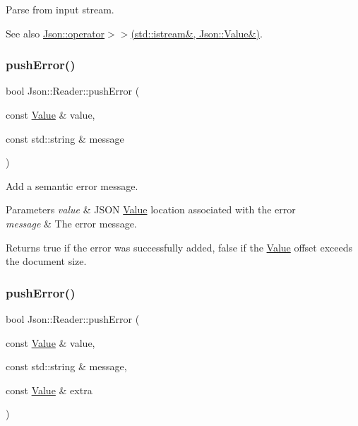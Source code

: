 Parse from input stream. 

\begin{DoxySeeAlso}{See also}
\hyperlink{namespace_json_a4d245ef719cc0853e8e78eb5f99c16e5}{Json\+::operator$>$$>$(std\+::istream\&, Json\+::\+Value\&)}. 
\end{DoxySeeAlso}
\mbox{\label{class_json_1_1_reader_ade6c28e0ef00d8f2e0aa2283f91c3e37}} 
\subsubsection{\texorpdfstring{push\+Error()}{pushError()}\hspace{0.1cm}{\footnotesize\ttfamily [1/2]}}
{\footnotesize\ttfamily bool Json\+::\+Reader\+::push\+Error (\begin{DoxyParamCaption}\item[{const \hyperlink{class_json_1_1_value}{Value} \&}]{value,  }\item[{const std\+::string \&}]{message }\end{DoxyParamCaption})}



Add a semantic error message. 


\begin{DoxyParams}{Parameters}
{\em value} & J\+S\+ON \hyperlink{class_json_1_1_value}{Value} location associated with the error \\
\hline
{\em message} & The error message. \\
\hline
\end{DoxyParams}
\begin{DoxyReturn}{Returns}
{\ttfamily true} if the error was successfully added, {\ttfamily false} if the \hyperlink{class_json_1_1_value}{Value} offset exceeds the document size. 
\end{DoxyReturn}
\mbox{\label{class_json_1_1_reader_a9b474233c3a7c688e340e70665d45223}} 
\subsubsection{\texorpdfstring{push\+Error()}{pushError()}\hspace{0.1cm}{\footnotesize\ttfamily [2/2]}}
{\footnotesize\ttfamily bool Json\+::\+Reader\+::push\+Error (\begin{DoxyParamCaption}\item[{const \hyperlink{class_json_1_1_value}{Value} \&}]{value,  }\item[{const std\+::string \&}]{message,  }\item[{const \hyperlink{class_json_1_1_value}{Value} \&}]{extra }\end{DoxyParamCaption})}



